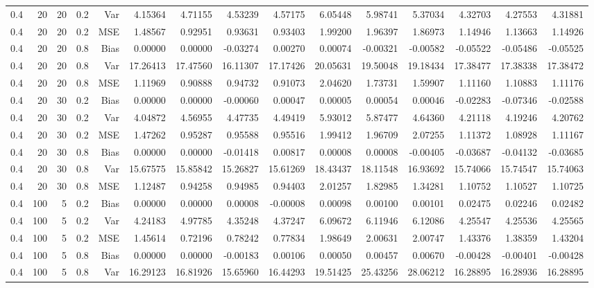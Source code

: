 \begin{table}[!htbp]
\begin{tabular}{lrrrrrrrrrrrrrr}
0.4 &  20 & 20 & 0.2 & Var & 4.15364 & 4.71155 & 4.53239 & 4.57175 & 6.05448 & 5.98741 & 5.37034 & 4.32703 & 4.27553 & 4.31881 \\
0.4 &  20 & 20 & 0.2 & MSE & 1.48567 & 0.92951 & 0.93631 & 0.93403 & 1.99200 & 1.96397 & 1.86973 & 1.14946 & 1.13663 & 1.14926 \\
0.4 &  20 & 20 & 0.8 & Bias & 0.00000 & 0.00000 & -0.03274 & 0.00270 & 0.00074 & -0.00321 & -0.00582 & -0.05522 & -0.05486 & -0.05525 \\
0.4 &  20 & 20 & 0.8 & Var & 17.26413 & 17.47560 & 16.11307 & 17.17426 & 20.05631 & 19.50048 & 19.18434 & 17.38477 & 17.38338 & 17.38472 \\
0.4 &  20 & 20 & 0.8 & MSE & 1.11969 & 0.90888 & 0.94732 & 0.91073 & 2.04620 & 1.73731 & 1.59907 & 1.11160 & 1.10883 & 1.11176 \\
0.4 &  20 & 30 & 0.2 & Bias & 0.00000 & 0.00000 & -0.00060 & 0.00047 & 0.00005 & 0.00054 & 0.00046 & -0.02283 & -0.07346 & -0.02588 \\
0.4 &  20 & 30 & 0.2 & Var & 4.04872 & 4.56955 & 4.47735 & 4.49419 & 5.93012 & 5.87477 & 4.64360 & 4.21118 & 4.19246 & 4.20762 \\
0.4 &  20 & 30 & 0.2 & MSE & 1.47262 & 0.95287 & 0.95588 & 0.95516 & 1.99412 & 1.96709 & 2.07255 & 1.11372 & 1.08928 & 1.11167 \\
0.4 &  20 & 30 & 0.8 & Bias & 0.00000 & 0.00000 & -0.01418 & 0.00817 & 0.00008 & 0.00008 & -0.00405 & -0.03687 & -0.04132 & -0.03685 \\
0.4 &  20 & 30 & 0.8 & Var & 15.67575 & 15.85842 & 15.26827 & 15.61269 & 18.43437 & 18.11548 & 16.93692 & 15.74066 & 15.74547 & 15.74063 \\
0.4 &  20 & 30 & 0.8 & MSE & 1.12487 & 0.94258 & 0.94985 & 0.94403 & 2.01257 & 1.82985 & 1.34281 & 1.10752 & 1.10527 & 1.10725 \\
0.4 & 100 &  5 & 0.2 & Bias & 0.00000 & 0.00000 & 0.00008 & -0.00008 & 0.00098 & 0.00100 & 0.00101 & 0.02475 & 0.02246 & 0.02482 \\
0.4 & 100 &  5 & 0.2 & Var & 4.24183 & 4.97785 & 4.35248 & 4.37247 & 6.09672 & 6.11946 & 6.12086 & 4.25547 & 4.25536 & 4.25565 \\
0.4 & 100 &  5 & 0.2 & MSE & 1.45614 & 0.72196 & 0.78242 & 0.77834 & 1.98649 & 2.00631 & 2.00747 & 1.43376 & 1.38359 & 1.43204 \\
0.4 & 100 &  5 & 0.8 & Bias & 0.00000 & 0.00000 & -0.00183 & 0.00106 & 0.00050 & 0.00457 & 0.00670 & -0.00428 & -0.00401 & -0.00428 \\
0.4 & 100 &  5 & 0.8 & Var & 16.29123 & 16.81926 & 15.65960 & 16.44293 & 19.51425 & 25.43256 & 28.06212 & 16.28895 & 16.28936 & 16.28895 \\

\end{tabular}
\end{table}
